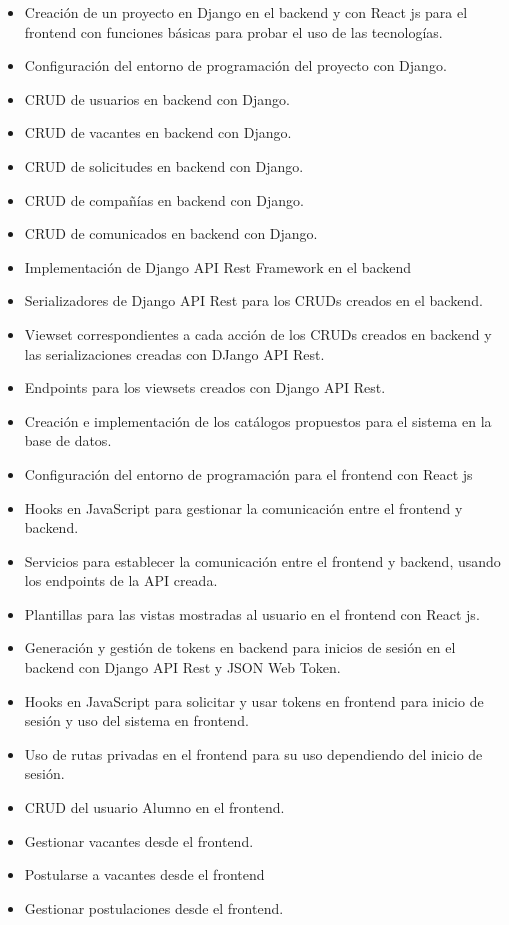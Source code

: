 \begin{itemize}
   \item Creación de un proyecto en Django en el backend y con React js para el frontend con funciones básicas para probar el uso de las tecnologías.
   \item Configuración del entorno de programación del proyecto con Django.
   \item CRUD de usuarios en backend con Django.
   \item CRUD de vacantes en backend con Django.
   \item CRUD de solicitudes en backend con Django.
   \item CRUD de compañías en backend con Django.
   \item CRUD de comunicados en backend con Django.
   \item Implementación de Django API Rest Framework en el backend
   \item Serializadores de Django API Rest para los CRUDs creados en el backend.
   \item Viewset correspondientes a cada acción de los CRUDs creados en backend y las serializaciones creadas con DJango API Rest.
   \item Endpoints para los viewsets creados con Django API Rest.
   \item Creación e implementación de los catálogos propuestos para el sistema en la base de datos.
   \item Configuración del entorno de programación para el frontend con React js
   \item Hooks en JavaScript para gestionar la comunicación entre el frontend y backend.
   \item Servicios para establecer la comunicación entre el frontend y backend, usando los endpoints de la API creada.
   \item Plantillas para las vistas mostradas al usuario en el frontend con React js.
   \item Generación y gestión de tokens en backend para inicios de sesión en el backend con Django API Rest y JSON Web Token.
   \item Hooks en JavaScript para solicitar y usar tokens en frontend para inicio de sesión y uso del sistema en frontend.
   \item Uso de rutas privadas en el frontend para su uso dependiendo del inicio de sesión.
   \item CRUD del usuario Alumno en el frontend.
   \item Gestionar vacantes desde el frontend.
   \item Postularse a vacantes desde el frontend
   \item Gestionar postulaciones desde el frontend.
\end{itemize}
    
    
    